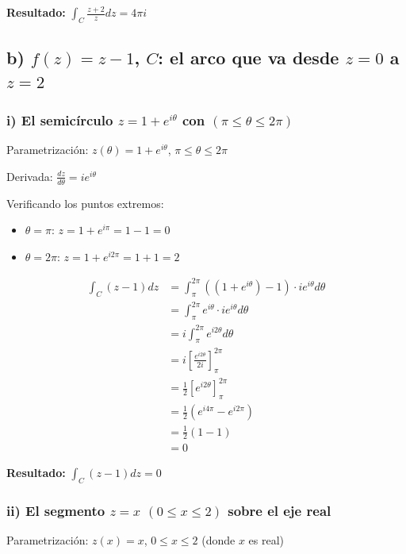 \documentclass{article}
\begin{document}
\textbf{Resultado:} $\int_C \frac{z + 2}{z} dz = 4\pi i$

\subsection*{b) $f(z) = z - 1$, $C$: el arco que va desde $z = 0$ a $z = 2$}

\subsubsection*{i) El semicírculo $z = 1 + e^{i\theta}$ con $(\pi \leq \theta \leq 2\pi)$}

Parametrización: $z(\theta) = 1 + e^{i\theta}$, $\pi \leq \theta \leq 2\pi$

Derivada: $\frac{dz}{d\theta} = ie^{i\theta}$

Verificando los puntos extremos:
\begin{itemize}
\item $\theta = \pi$: $z = 1 + e^{i\pi} = 1 - 1 = 0$ \checkmark
\item $\theta = 2\pi$: $z = 1 + e^{i2\pi} = 1 + 1 = 2$ \checkmark
\end{itemize}

\begin{align*}
\int_C (z - 1) dz &= \int_{\pi}^{2\pi} ((1 + e^{i\theta}) - 1) \cdot ie^{i\theta} d\theta \\
                  &= \int_{\pi}^{2\pi} e^{i\theta} \cdot ie^{i\theta} d\theta \\
                  &= i \int_{\pi}^{2\pi} e^{i2\theta} d\theta \\
                  &= i \left[\frac{e^{i2\theta}}{2i}\right]_{\pi}^{2\pi} \\
                  &= \frac{1}{2} \left[e^{i2\theta}\right]_{\pi}^{2\pi} \\
                  &= \frac{1}{2} (e^{i4\pi} - e^{i2\pi}) \\
                  &= \frac{1}{2} (1 - 1) \\
                  &= 0
\end{align*}

\textbf{Resultado:} $\int_C (z - 1) dz = 0$

\subsubsection*{ii) El segmento $z = x$ $(0 \leq x \leq 2)$ sobre el eje real}

Parametrización: $z(x) = x$, $0 \leq x \leq 2$ (donde $x$ es real)
\end{document}
